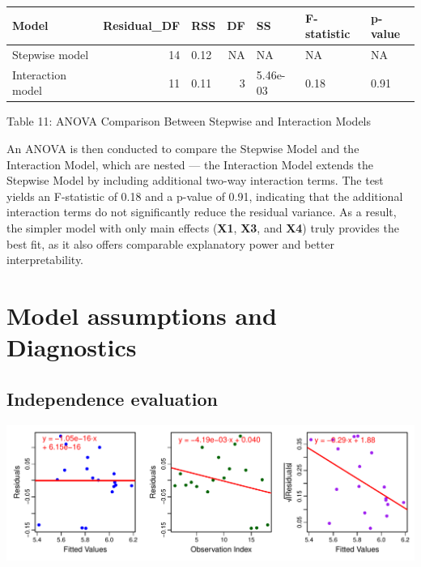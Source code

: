 \documentclass[
  12pt,
]{article}
\begin{document}
\begin{table}[!h]
\centering\begingroup\fontsize{8}{10}\selectfont

\begin{tabular}{lrlrlll}
\toprule
Model & Residual\_DF & RSS & DF & SS & F-statistic & p-value\\
\midrule
Stepwise model & 14 & 0.12 & NA & NA & NA & NA\\
Interaction model & 11 & 0.11 & 3 & 5.46e-03 & 0.18 & 0.91\\
\bottomrule
\end{tabular}
\endgroup{}
\end{table}
\begin{center}
\vspace{-1.6em}
{\fontsize{12}{14}\selectfont Table 11: ANOVA Comparison Between Stepwise and Interaction Models\par}
\end{center}

An ANOVA is then conducted to compare the Stepwise Model and the
Interaction Model, which are nested --- the Interaction Model extends
the Stepwise Model by including additional two-way interaction terms.
The test yields an F-statistic of 0.18 and a p-value of 0.91, indicating
that the additional interaction terms do not significantly reduce the
residual variance. As a result, the simpler model with only main effects
(\textbf{X1}, \textbf{X3}, and \textbf{X4}) truly provides the best fit,
as it also offers comparable explanatory power and better
interpretability.

\section{Model assumptions and
Diagnostics}\label{model-assumptions-and-diagnostics}

\subsection{Independence evaluation}\label{independence-evaluation}

\includegraphics{report1_r1_files/figure-latex/unnamed-chunk-11-1.pdf}
\end{document}
